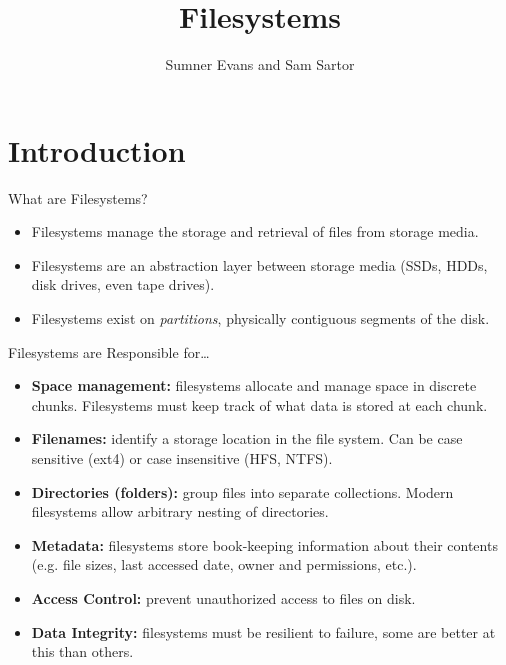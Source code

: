 \documentclass{lug}
\title{Filesystems}
\author{Sumner Evans and Sam Sartor}
\institute{Mines Linux Users Group}
\newcommand{\splitslide}[4]{
    \noindent
    \begin{minipage}{#1 \textwidth - #2 }
        #3
    \end{minipage}%
    \hspace{ \dimexpr #2 * 2 \relax }%
    \begin{minipage}{\textwidth - #1 \textwidth - #2 }
        #4
    \end{minipage}
}
\begin{document}
\section{Introduction}

\begin{frame}{What are Filesystems?}
    \begin{itemize}
        \item Filesystems manage the storage and retrieval of files from storage
            media.
        \item Filesystems are an abstraction layer between storage media (SSDs,
            HDDs, disk drives, even tape drives).
        \item Filesystems exist on \textit{partitions}, physically contiguous
            segments of the disk.
    \end{itemize}
\end{frame}

\begin{frame}{Filesystems are Responsible for\ldots}
    \begin{itemize}
        \item \textbf{Space management:} filesystems allocate and manage space
            in discrete chunks. Filesystems must keep track of what data is
            stored at each chunk.
        \item \textbf{Filenames:} identify a storage location in the file
            system. Can be case sensitive (ext4) or case insensitive (HFS,
            NTFS).
        \item \textbf{Directories (folders):} group files into separate
            collections. Modern filesystems allow arbitrary nesting of
            directories.
        \item \textbf{Metadata:} filesystems store book-keeping information
            about their contents (e.g. file sizes, last accessed date, owner and
            permissions, etc.).
        \item \textbf{Access Control:} prevent unauthorized access to files on
            disk.
        \item \textbf{Data Integrity:} filesystems must be resilient to failure,
            some are better at this than others.
    \end{itemize}
\end{frame}

\end{document}
